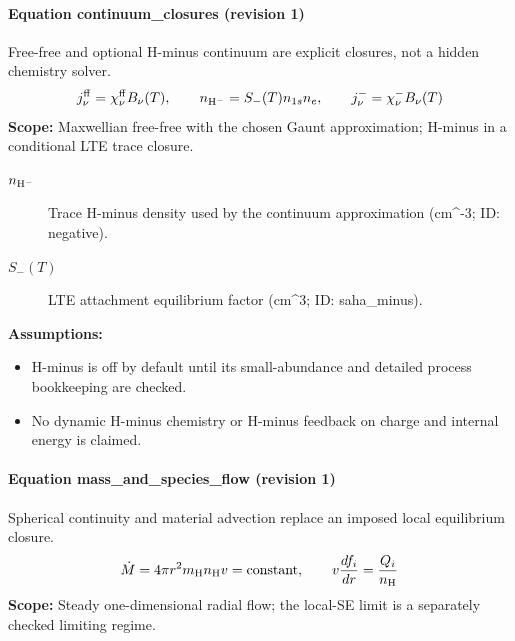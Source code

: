\paragraph{Equation continuum\_closures (revision 1)}
Free-free and optional H-minus continuum are explicit closures, not a hidden chemistry solver.
\begin{equation}
\begin{aligned}
j_\nu^{\rm ff}=\chi_\nu^{\rm ff}B_\nu(T),\qquad n_{\rm H^-}=S_-(T)n_{1s}n_e,\qquad j_\nu^{-}=\chi_\nu^{-}B_\nu(T)
\end{aligned}
\label{eq:escape.coupled_5f_hydrogen:continuum_5f_closures:1}
\end{equation}
\noindent\textbf{Scope:} Maxwellian free-free with the chosen Gaunt approximation; H-minus in a conditional LTE trace closure.

\begin{description}
\item[$n_{\rm H^-}$] Trace H-minus density used by the continuum approximation (cm\textasciicircum{}-3; ID: negative).
\item[$S_-(T)$] LTE attachment equilibrium factor (cm\textasciicircum{}3; ID: saha\_minus).
\end{description}

\noindent\textbf{Assumptions:}
\begin{itemize}
\item H-minus is off by default until its small-abundance and detailed process bookkeeping are checked.
\item No dynamic H-minus chemistry or H-minus feedback on charge and internal energy is claimed.
\end{itemize}

\paragraph{Equation mass\_and\_species\_flow (revision 1)}
Spherical continuity and material advection replace an imposed local equilibrium closure.
\begin{equation}
\begin{aligned}
\dot M=4\pi r^2m_{\rm H}n_{\rm H}v=\mathrm{constant},\qquad v\frac{df_i}{dr}=\frac{Q_i}{n_{\rm H}}
\end{aligned}
\label{eq:escape.coupled_5f_hydrogen:mass_5f_and_5f_species_5f_flow:1}
\end{equation}
\noindent\textbf{Scope:} Steady one-dimensional radial flow; the local-SE limit is a separately checked limiting regime.

